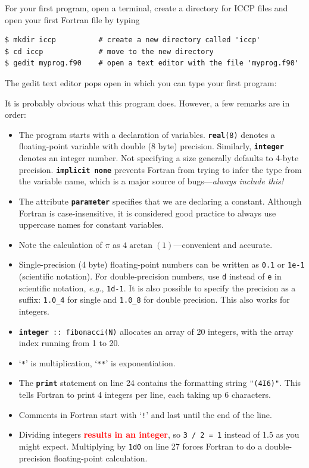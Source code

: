 \documentclass[openany,oneside]{report}
\newcommand{\keyword}[1]{\texttt{\bfseries\color{DarkBlue}#1}}
\newcommand{\str}[1]{\texttt{\color{DarkRed}#1}}
\begin{document}
For your first program, open a terminal, create a directory for ICCP files and open your first Fortran file by typing
\begin{verbatim}
$ mkdir iccp          # create a new directory called 'iccp'
$ cd iccp             # move to the new directory
$ gedit myprog.f90    # open a text editor with the file 'myprog.f90'
\end{verbatim}
The gedit text editor pops open in which you can type your first program:

It is probably obvious what this program does. However, a few remarks are in order:
\begin{itemize}
  \item The program starts with a declaration of variables.
    \texttt{\keyword{real}(8)} denotes a floating-point variable with double (8 byte) precision. 
    Similarly, \keyword{integer} denotes an integer number.
    Not specifying a size generally defaults to 4-byte precision.
    \keyword{implicit none} prevents Fortran from trying to infer the type from the variable name, which is a major source of bugs---\emph{always include this!}
  \item The attribute \keyword{parameter} specifies that we are declaring a constant.
    Although Fortran is case-insensitive, it is considered good practice to always use uppercase names for constant variables.
  \item Note the calculation of $\pi$ as $4\arctan(1)$---convenient and accurate.
  \item Single-precision (4 byte) floating-point numbers can be written as \texttt{0.1} or \texttt{1e-1} (scientific notation). 
    For double-precision numbers, use \texttt{d} instead of \texttt{e} in scientific notation, \emph{e.g.}, \texttt{1d-1}. 
    It is also possible to specify the precision as a suffix: \texttt{1.0\_4} for single and \texttt{1.0\_8} for double precision. 
    This also works for integers.
  \item \texttt{\keyword{integer} :: fibonacci(N)} allocates an array of 20 integers, with the array index running from 1 to 20.
  \item `\texttt{*}' is multiplication, `\texttt{**}' is exponentiation.
  \item The \keyword{print} statement on line 24 contains the formatting string \str{"(4I6)"}. 
    This tells Fortran to print 4 integers per line, each taking up 6 characters.
  \item Comments in Fortran start with `\texttt{!}' and last until the end of the line.
  \item Dividing integers \textcolor{red}{\textbf{results in an integer}}, so \texttt{3 / 2 = 1} instead of 1.5 as you might expect. 
    Multiplying by \texttt{1d0} on line 27 forces Fortran to do a double-precision floating-point calculation.
\end{itemize}
\end{document}
